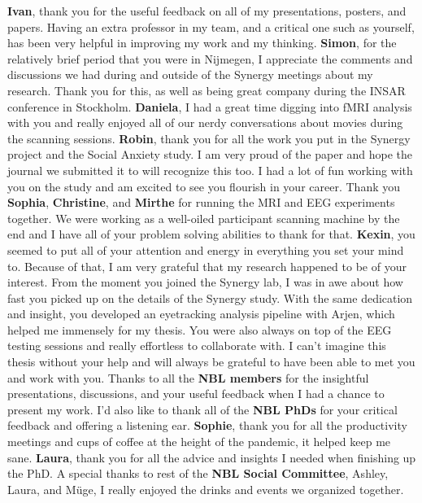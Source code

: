 \textbf{Ivan}, thank you for the useful feedback on all of my presentations, posters, and papers. Having an extra professor in my team, and a critical one such as yourself, has been very helpful in improving my work and my thinking. \newline
\textbf{Simon}, for the relatively brief period that you were in Nijmegen, I appreciate the comments and discussions we had during and outside of the Synergy meetings about my research. Thank you for this, as well as being great company during the INSAR conference in Stockholm. \newline
\textbf{Daniela}, I had a great time digging into fMRI analysis with you and really enjoyed all of our nerdy conversations about movies during the scanning sessions. \newline
\textbf{Robin}, thank you for all the work you put in the Synergy project and the Social Anxiety study. I am very proud of the paper and hope the journal we submitted it to will recognize this too. I had a lot of fun working with you on the study and am excited to see you flourish in your career. \newline
Thank you \textbf{Sophia}, \textbf{Christine}, and \textbf{Mirthe} for running the MRI and EEG experiments together. We were working as a well-oiled participant scanning machine by the end and I have all of your problem solving abilities to thank for that. \newline
\textbf{Kexin}, you seemed to put all of your attention and energy in everything you set your mind to. Because of that, I am very grateful that my research happened to be of your interest. From the moment you joined the Synergy lab, I was in awe about how fast you picked up on the details of the Synergy study. With the same dedication and insight, you developed an eyetracking analysis pipeline with Arjen, which helped me immensely for my thesis. You were also always on top of the EEG testing sessions and really effortless to collaborate with. I can't imagine this thesis without your help and will always be grateful to have been able to met you and work with you. \newline
Thanks to all the \textbf{NBL members} for the insightful presentations, discussions, and your useful feedback when I had a chance to present my work. I'd also like to thank all of the \textbf{NBL PhDs} for your critical feedback and offering a listening ear. \textbf{Sophie}, thank you for all the productivity meetings and cups of coffee at the height of the pandemic, it helped keep me sane. \textbf{Laura}, thank you for all the advice and insights I needed when finishing up the PhD. A special thanks to rest of the \textbf{NBL Social Committee}, Ashley, Laura, and M\"{u}ge, I really enjoyed the drinks and events we organized together. 
